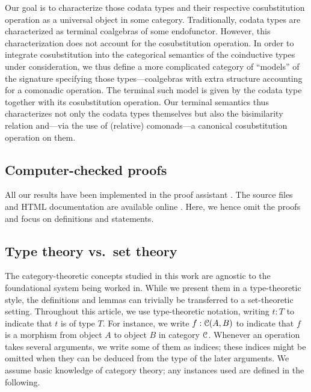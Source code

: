\documentclass[a4paper,USenglish]{lipics}
\newcommand{\parencite}[1]{\cite{#1}}
\begin{document}
 Our goal is to characterize those codata types and their respective cosubstitution operation as a universal object in some category.
 Traditionally, codata types are characterized as terminal coalgebras of some endofunctor. However, this characterization does not account for 
 the cosubstitution operation.
 In order to integrate cosubstitution into the categorical semantics of the coinductive types under consideration,
 we thus define a more complicated category of \enquote{models} of the signature specifying those types---coalgebras with extra structure accounting for a 
 comonadic operation.
 The terminal such model is given by the codata type together with its cosubstitution operation.
 Our terminal semantics thus characterizes not only the codata types themselves but also the bisimilarity relation 
 and---via the use of (relative) comonads---a canonical cosubstitution operation on them.
 
 

 \subsection{Computer-checked proofs}\label{sec:computer_checked}

 
 All our results have been implemented in the proof assistant \coq \parencite{coq84pl6}.
 The \coq source files and HTML documentation are available online \parencite{trimat_coq}.
 Here, we hence omit the proofs and focus on definitions and statements.
 

 
 
 \subsection{Type theory vs.\ set theory} \label{sec:type_vs_set} The category-theoretic concepts studied in this work are agnostic to the foundational system being worked in.
 While we present them in a type-theoretic style, the definitions and lemmas can trivially be transferred to a set-theoretic setting.
 Throughout this article, we use type-theoretic notation,  writing $t:T$ to indicate that $t$ is of type $T$. 
 For instance, we write $f : {\mathcal{C}}(A,B)$ to indicate that $f$ is a morphism from object $A$ to object $B$ in category ${\mathcal{C}}$.
 Whenever an operation takes several arguments, we write some of them as indices; these indices might be omitted when 
 they can be deduced from the type of the later arguments.
 We assume basic knowledge of category theory; any instances used are defined in the following.
  
\end{document}
